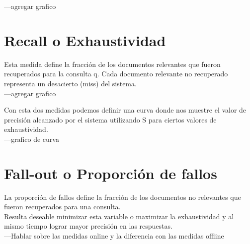 ---agregar grafico

\section{Recall o Exhaustividad}
Esta medida define la fracción de los documentos relevantes que fueron recuperados para la consulta q. Cada documento relevante no recuperado representa un desacierto (miss) del sistema. \\

---agregar grafico

Con esta dos medidas podemos definir una curva donde nos muestre el valor de precisión alcanzado por el sistema utilizando S para ciertos valores de exhaustividad. \\

---grafico de curva \\

\section{Fall-out o Proporción de fallos}
La proporción de fallos define la fracción de los documentos no relevantes que fueron recuperados para una consulta.\\
Resulta deseable minimizar esta variable o maximizar la exhaustividad y al mismo tiempo lograr mayor precisión en las respuestas. \\

---Hablar sobre las medidas online y la diferencia con las medidas offline
